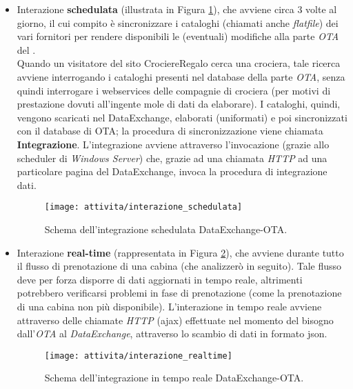 \begin{itemize}
	\item Interazione \textbf{schedulata} (illustrata in Figura \ref{figura:integrazione-schedulata}), che avviene circa 3 volte al giorno, il cui compito è sincronizzare i cataloghi (chiamati anche \textit{flatfile}) dei vari fornitori per rendere disponibili le (eventuali) modifiche alla parte \textit{OTA} del \bookingEngine. \\Quando un visitatore del sito CrociereRegalo cerca una crociera, tale ricerca avviene interrogando i cataloghi presenti nel database della parte \textit{OTA}, senza quindi interrogare i \glspl{webservice} delle compagnie di crociera (per motivi di prestazione dovuti all'ingente mole di dati da elaborare). I cataloghi, quindi, vengono scaricati nel DataExchange, elaborati (uniformati) e poi sincronizzati con il database di OTA; la procedura di sincronizzazione viene chiamata \textbf{Integrazione}. L'integrazione avviene attraverso l'invocazione (grazie allo scheduler di \textit{Windows Server}) che, grazie ad una chiamata \textit{HTTP} ad una particolare pagina del DataExchange, invoca la procedura di integrazione dati.
	\begin{figure}[!h] 
		\centering 
		\texttt{[image: attivita/interazione\_schedulata]} 
		\caption{Schema dell'integrazione schedulata DataExchange-OTA.}
		\label{figura:integrazione-schedulata}
	\end{figure}
	\item Interazione \textbf{real-time} (rappresentata in Figura \ref{figura:integrazione-realtime}), che avviene durante tutto il flusso di prenotazione di una cabina (che analizzerò in seguito). Tale flusso deve per forza disporre di dati aggiornati in tempo reale, altrimenti potrebbero verificarsi problemi in fase di prenotazione (come la prenotazione di una cabina non più disponibile). L'interazione in tempo reale avviene attraverso delle chiamate \textit{HTTP} (\gls{ajax}) effettuate nel momento del bisogno dall'\textit{OTA} al \textit{DataExchange}, attraverso lo scambio di dati in formato \gls{json}.
	\begin{figure}[!h] 
		\centering 
		\texttt{[image: attivita/interazione\_realtime]} 
		\caption{Schema dell'integrazione in tempo reale DataExchange-OTA.}
		\label{figura:integrazione-realtime}
	\end{figure}
\end{itemize}

